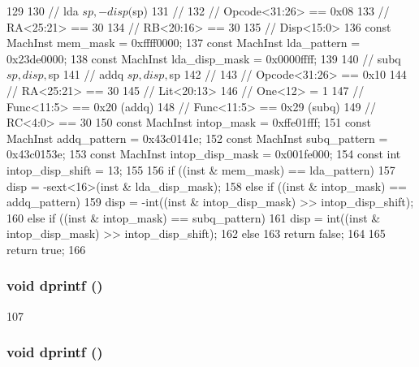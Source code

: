 \begin{DoxyCode}
129 {
130     // lda $sp, -disp($sp)
131     //
132     // Opcode<31:26> == 0x08
133     // RA<25:21> == 30
134     // RB<20:16> == 30
135     // Disp<15:0>
136     const MachInst mem_mask = 0xffff0000;
137     const MachInst lda_pattern = 0x23de0000;
138     const MachInst lda_disp_mask = 0x0000ffff;
139 
140     // subq $sp, disp, $sp
141     // addq $sp, disp, $sp
142     //
143     // Opcode<31:26> == 0x10
144     // RA<25:21> == 30
145     // Lit<20:13>
146     // One<12> = 1
147     // Func<11:5> == 0x20 (addq)
148     // Func<11:5> == 0x29 (subq)
149     // RC<4:0> == 30
150     const MachInst intop_mask = 0xffe01fff;
151     const MachInst addq_pattern = 0x43c0141e;
152     const MachInst subq_pattern = 0x43c0153e;
153     const MachInst intop_disp_mask = 0x001fe000;
154     const int intop_disp_shift = 13;
155 
156     if ((inst & mem_mask) == lda_pattern)
157         disp = -sext<16>(inst & lda_disp_mask);
158     else if ((inst & intop_mask) == addq_pattern)
159         disp = -int((inst & intop_disp_mask) >> intop_disp_shift);
160     else if ((inst & intop_mask) == subq_pattern)
161         disp = int((inst & intop_disp_mask) >> intop_disp_shift);
162     else
163         return false;
164 
165     return true;
166 }
\end{DoxyCode}
\hypertarget{classMipsISA_1_1StackTrace_a70fdc8802b54b4244889a2d3553405d5}{
\subsubsection[{dprintf}]{\setlength{\rightskip}{0pt plus 5cm}void dprintf ()}}
\label{classMipsISA_1_1StackTrace_a70fdc8802b54b4244889a2d3553405d5}



\begin{DoxyCode}
107 {}
\end{DoxyCode}
\hypertarget{classMipsISA_1_1StackTrace_a70fdc8802b54b4244889a2d3553405d5}{
\subsubsection[{dprintf}]{\setlength{\rightskip}{0pt plus 5cm}void dprintf ()}}
\label{classMipsISA_1_1StackTrace_a70fdc8802b54b4244889a2d3553405d5}



